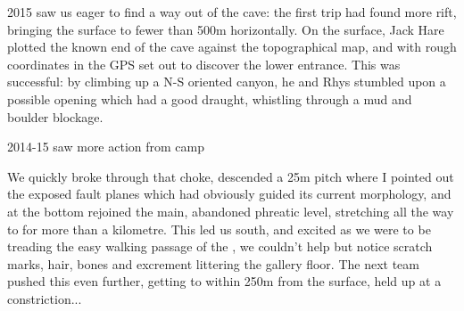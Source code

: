 2015 saw us eager to find a way out of the cave: the first trip had found more rift, bringing the surface to fewer than 500m horizontally. On the surface, Jack Hare plotted the known end of the cave against the topographical map, and with rough coordinates in the GPS set out to discover the lower entrance. This was successful: by climbing up a N-S oriented canyon, he and Rhys stumbled upon a possible opening which had a good draught, whistling through a mud and boulder blockage. 

\begin{marginfigure}
	\checkoddpage \ifoddpage \forcerectofloat \else \forceversofloat \fi
	\centering	{} 
  	\caption{2014-15 saw more action from camp \protect{} }
	\end{marginfigure}

We quickly broke through that choke, descended a 25m pitch where I pointed out the exposed fault planes which had obviously guided its current morphology, and at the bottom rejoined the main, abandoned phreatic level, stretching all the way to  for more than a kilometre. This led us south, and excited as we were to be treading the easy walking passage of the , we couldn't help but notice scratch marks, hair, bones and excrement littering the gallery floor. The next team pushed this even further, getting to within 250m from the surface, held up at a constriction...

